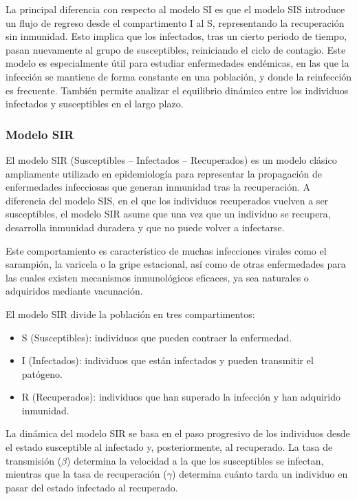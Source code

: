 La principal diferencia con respecto al modelo SI es que el modelo SIS introduce un flujo de regreso desde el compartimento I al S, representando la recuperación sin inmunidad. Esto implica que los infectados, tras un cierto periodo de tiempo, pasan nuevamente al grupo de susceptibles, reiniciando el ciclo de contagio.
Este modelo es especialmente útil para estudiar enfermedades endémicas, en las que la infección se mantiene de forma constante en una población, y donde la reinfección es frecuente. También permite analizar el equilibrio dinámico entre los individuos infectados y susceptibles en el largo plazo.


\subsubsection*{Modelo SIR}
El modelo SIR (Susceptibles – Infectados – Recuperados) es un modelo clásico ampliamente utilizado en epidemiología para representar la propagación de enfermedades infecciosas que generan inmunidad tras la recuperación. A diferencia del modelo SIS, en el que los individuos recuperados vuelven a ser susceptibles, el modelo SIR asume que una vez que un individuo se recupera, desarrolla inmunidad duradera y que no puede volver a infectarse.

Este comportamiento es característico de muchas infecciones virales como el sarampión, la varicela o la gripe estacional, así como de otras enfermedades para las cuales existen mecanismos inmunológicos eficaces, ya sea naturales o adquiridos mediante vacunación.

El modelo SIR divide la población en tres compartimentos:
\begin{itemize}
    \item S (Susceptibles): individuos que pueden contraer la enfermedad.
    \item I (Infectados): individuos que están infectados y pueden transmitir el patógeno.
    \item R (Recuperados): individuos que han superado la infección y han adquirido inmunidad.
\end{itemize}

La dinámica del modelo SIR se basa en el paso progresivo de los individuos desde el estado susceptible al infectado y, posteriormente, al recuperado. La tasa de transmisión ($\beta$) determina la velocidad a la que los susceptibles se infectan, mientras que la tasa de recuperación ($\gamma$) determina cuánto tarda un individuo en pasar del estado infectado al recuperado.

